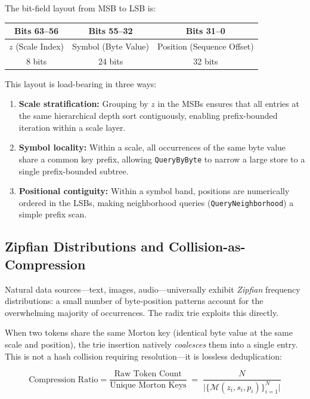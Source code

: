 \noindent The bit-field layout from MSB to LSB is:

\begin{center}
\begin{tabular}{ccc}
  \toprule
  \textbf{Bits 63--56} & \textbf{Bits 55--32} & \textbf{Bits 31--0} \\
  \midrule
  $z$ (Scale Index) & Symbol (Byte Value) & Position (Sequence Offset) \\
  8 bits & 24 bits & 32 bits \\
  \bottomrule
\end{tabular}
\end{center}

This layout is load-bearing in three ways:
\begin{enumerate}[nosep]
  \item \textbf{Scale stratification:}  Grouping by $z$ in the MSBs
        ensures that all entries at the same hierarchical depth sort
        contiguously, enabling prefix-bounded iteration within a
        scale layer.
  \item \textbf{Symbol locality:}  Within a scale, all occurrences of the
        same byte value share a common key prefix, allowing
        \texttt{QueryByByte} to narrow a large store to a single
        prefix-bounded subtree.
  \item \textbf{Positional contiguity:}  Within a symbol band, positions
        are numerically ordered in the LSBs, making neighborhood
        queries (\texttt{QueryNeighborhood}) a simple prefix scan.
\end{enumerate}

\subsection{Zipfian Distributions and Collision-as-Compression}
\label{sec:collision_is_compression}

Natural data sources---text, images, audio---universally exhibit
\emph{Zipfian} frequency distributions: a small number of byte-position
patterns account for the overwhelming majority of occurrences.  The radix
trie exploits this directly.

When two tokens share the same Morton key (identical byte value at the
same scale and position), the trie insertion natively \emph{coalesces}
them into a single entry.  This is not a hash collision requiring
resolution---it is lossless deduplication:

\begin{equation}
  \text{Compression Ratio} =
    \frac{\text{Raw Token Count}}{\text{Unique Morton Keys}}
    \;=\;
    \frac{N}{\lvert\{\mathcal{M}(z_i, s_i, p_i)\}_{i=1}^{N}\rvert}
  \label{eq:compression_ratio}
\end{equation}

